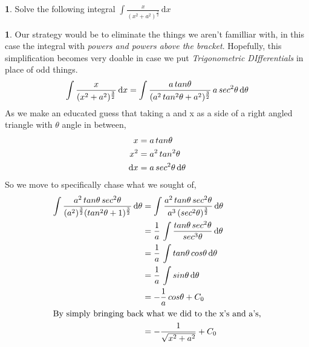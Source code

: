 \documentclass[11pt,a4paper,twocolumn]{article}
\theoremstyle{definition}
\theoremstyle{definition}
\newtheorem{pr}{ \framebox[0.05\textwidth]{Pr} }
\theoremstyle{definition}
\theoremstyle{definition}
\newtheorem{sol}{ \framebox[0.05\textwidth]{Sol} }
\begin{document}
\begin{pr}
 Solve the following integral $\int\frac{x}{(x^2+a^2)^{\frac{3}{2}}}\, \mathrm{d}x  $
\end{pr}
\begin{sol}
Our strategy would be to eliminate the things we aren't familliar with, in this case the integral with \emph{powers and powers above the bracket}. Hopefully, this simplification becomes very doable in case we put \emph{Trigonometric DIfferentials} in place of odd things.
\begin{align}
\int\frac{x}{(x^2+a^2)^ {\frac{3}{2}}} \, \mathrm{d}x \notag = \int\frac{a\,tan\theta}{ (a^2\, tan^2\theta + a^2)^ {\frac{3}{2}} } \, a\, sec^2\theta \,\mathrm{d}\theta
\end{align}
As we make an educated guess that taking a and x as a side of a right angled triangle with $\theta$ angle in between,
\begin{align}
x & = a \, tan\theta  \notag \\
 x^2 & = a^2 \, tan^2\theta  \notag \\
 \mathrm{d}x& = a \,sec^2 \theta\, \mathrm{d}\theta \notag
\end{align}
So we move to specifically chase what we sought of,\\
\begin{align}
\int \frac{a^2 \, tan\theta \,sec^2\theta}
    		{ (a^2)^{\frac{3}{2}} (tan^2\theta + 1)^{\frac{3}{2}} } \, \mathrm{d}\theta	\notag 
&=\int \frac{a^2 \, tan\theta \,sec^2\theta}
			{a^3 \, (sec^2\theta)^ {\frac{3}{2}} }	\, \mathrm{d}\theta	\notag \\
&= \frac{1}{a} \, \int \frac{tan\theta \, sec^2\theta}
								{sec^3\theta} \,\mathrm{d}\theta		\notag \\
&= \frac{1}{a} \, \int tan\theta \, cos\theta 	\, \mathrm{d}\theta \notag \\
%
&=\frac{1}{a} \, \int sin\theta \, \mathrm{d}\theta \notag	\\
&= - \frac{1}{a} \, cos\theta + C_0 \\
\intertext{By simply bringing back what we did to the x's and a's,}
&= - \frac{1}{\sqrt{x^2 + a^2}} + C_0 \notag
\end{align}
\end{sol}
\end{document}
